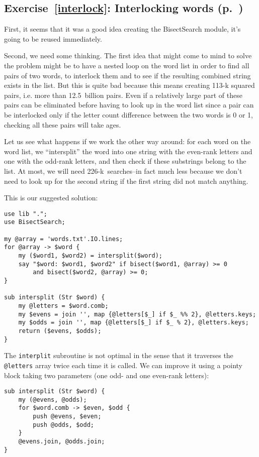 {\subsection{Exercise~\ref{interlock}: Interlocking words (p.~\pageref{interlock})}
\label{sol_interlock}

First, it seems that it was a good idea creating the 
BisectSearch module, it's going to be reused immediately.

Second, we need some thinking. The first idea that might 
come to mind to solve the problem might be to have a 
nested loop on the word list in order to find all pairs 
of two words, to interlock them and to see if the resulting 
combined string exists in the list. But this is quite bad 
because this means creating 113-k squared pairs, i.e. more 
than 12.5~billion pairs. Even if a relatively large part 
of these pairs can be eliminated before having to look up in 
the word list since a pair can be interlocked only if the 
letter count difference between the two words is 0 or 1, 
checking all these pairs will take ages.

Let us see what happens if we work the other way around: for 
each word on the word list, we ``intersplit'' the word into 
one string with the even-rank letters and one with the odd-rank 
letters, and then check if these substrings belong to the 
list. At most, we will need 226-k~searches--in fact much less 
because we don't need to look up for the second string if the 
first string did not match anything.

This is our suggested solution:
\begin{verbatim}
use lib ".";
use BisectSearch;

my @array = 'words.txt'.IO.lines;
for @array -> $word {
    my ($word1, $word2) = intersplit($word);
    say "$word: $word1, $word2" if bisect($word1, @array) >= 0 
        and bisect($word2, @array) >= 0;
}

sub intersplit (Str $word) {
    my @letters = $word.comb;
    my $evens = join '', map {@letters[$_] if $_ %% 2}, @letters.keys;
    my $odds = join '', map {@letters[$_] if $_ % 2}, @letters.keys;
    return ($evens, $odds);
}
\end{verbatim}

The {\tt interplit} subroutine is not optimal in the 
sense that it traverses the \verb'@letters' array twice 
each time it is called. We can improve it using a pointy 
block taking two parameters (one odd- and one even-rank 
letters):
\begin{verbatim}
sub intersplit (Str $word) {
    my (@evens, @odds);
    for $word.comb -> $even, $odd {
        push @evens, $even;
        push @odds, $odd;
    }
    @evens.join, @odds.join;
}
\end{verbatim}

}
